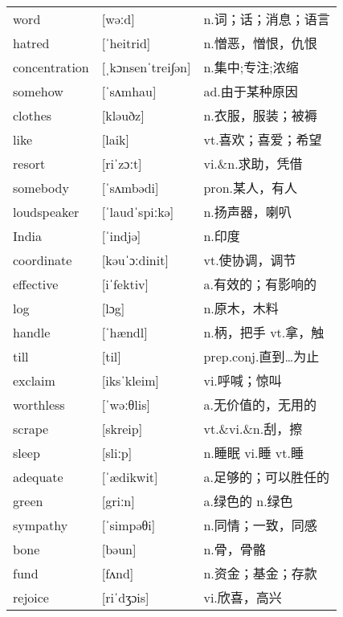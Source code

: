 \documentclass[a4paper]{article}
\begin{document}
\section{}
\begin{tabular}{l l l}

word & [wəːd] & n.词；话；消息；语言 \\
hatred & [ˈheitrid] & n.憎恶，憎恨，仇恨 \\
concentration & [ˌkɔnsenˈtrei∫ən] & n.集中;专注;浓缩 \\
somehow & [ˈsʌmhau] & ad.由于某种原因 \\
clothes & [kləuðz] & n.衣服，服装；被褥 \\
like & [laik] & vt.喜欢；喜爱；希望 \\
resort & [riˈzɔːt] & vi.\&n.求助，凭借 \\
somebody & [ˈsʌmbədi] & pron.某人，有人 \\
loudspeaker & [ˈlaudˈspiːkə] & n.扬声器，喇叭 \\
India & [ˈindjə] & n.印度 \\
coordinate & [kəuˈɔːdinit] & vt.使协调，调节 \\
effective & [iˈfektiv] & a.有效的；有影响的 \\
log & [lɔg] & n.原木，木料 \\
handle & [ˈhændl] & n.柄，把手 vt.拿，触 \\
till & [til] & prep.conj.直到…为止 \\
exclaim & [iksˈkleim] & vi.呼喊；惊叫 \\
worthless & [ˈwəːθlis] & a.无价值的，无用的 \\
scrape & [skreip] & vt.\&vi.\&n.刮，擦 \\
sleep & [sliːp] & n.睡眠 vi.睡 vt.睡 \\
adequate & [ˈædikwit] & a.足够的；可以胜任的 \\
green & [griːn] & a.绿色的 n.绿色 \\
sympathy & [ˈsimpəθi] & n.同情；一致，同感 \\
bone & [bəun] & n.骨，骨骼 \\
fund & [fʌnd] & n.资金；基金；存款 \\
rejoice & [riˈdʒɔis] & vi.欣喜，高兴 \\

\end{tabular}
\end{document}
